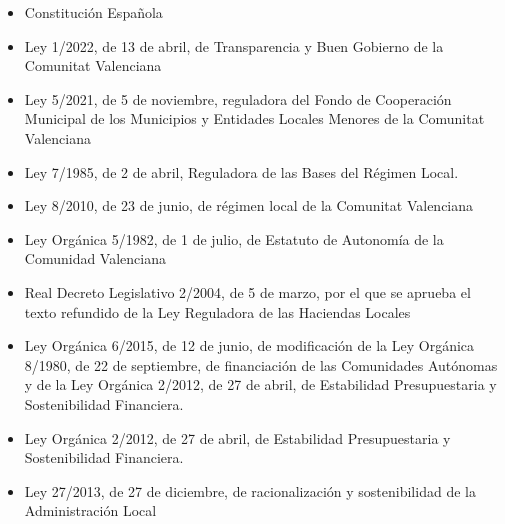 \documentclass[
]{article}
\begin{document}
\begin{itemize}
\item
  Constitución Española
\item
  Ley 1/2022, de 13 de abril, de Transparencia y Buen Gobierno de la
  Comunitat Valenciana
\item
  Ley 5/2021, de 5 de noviembre, reguladora del Fondo de Cooperación
  Municipal de los Municipios y Entidades Locales Menores de la
  Comunitat Valenciana
\item
  Ley 7/1985, de 2 de abril, Reguladora de las Bases del Régimen Local.
\item
  Ley 8/2010, de 23 de junio, de régimen local de la Comunitat
  Valenciana
\item
  Ley Orgánica 5/1982, de 1 de julio, de Estatuto de Autonomía de la
  Comunidad Valenciana
\item
  Real Decreto Legislativo 2/2004, de 5 de marzo, por el que se aprueba
  el texto refundido de la Ley Reguladora de las Haciendas Locales
\item
  Ley Orgánica 6/2015, de 12 de junio, de modificación de la Ley
  Orgánica 8/1980, de 22 de septiembre, de financiación de las
  Comunidades Autónomas y de la Ley Orgánica 2/2012, de 27 de abril, de
  Estabilidad Presupuestaria y Sostenibilidad Financiera.
\item
  Ley Orgánica 2/2012, de 27 de abril, de Estabilidad Presupuestaria y
  Sostenibilidad Financiera.
\item
  Ley 27/2013, de 27 de diciembre, de racionalización y sostenibilidad
  de la Administración Local
\end{itemize}
\end{document}
